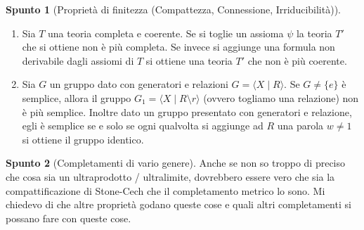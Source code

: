 \documentclass[a4paper,NoNotes,GeneralMath]{stdmdoc}
\theoremstyle{definition}
\newtheorem{spunto}{Spunto}
\begin{document}
\begin{spunto}[Proprietà di finitezza (Compattezza, Connessione, Irriducibilità)]
\begin{enumerate}
				\begin{enumerate}
					\item Se $\tau \subseteq \tau_{+}$ allora $(X, \tau_{+})$ non è più compatto.
					\item Se $\tau_{-} \subseteq \tau$ allora $(X, \tau_{-})$ non è più di Haussdorf.
				\end{enumerate}
			\item Sia $T$ una teoria completa e coerente. Se si toglie un assioma $\psi$ la teoria $T'$ che si ottiene non è più completa. Se invece si aggiunge una formula non derivabile dagli assiomi di $T$ si ottiene una teoria $T'$ che non è più coerente.
			\item Sia $G$ un gruppo dato con generatori e relazioni $G = \langle X \mid R \rangle$. Se $G \neq \{ e \}$ è semplice, allora il gruppo $G_1 = \langle X \mid R \setminus r \rangle$ (ovvero togliamo una relazione) non è più semplice.
				Inoltre dato un gruppo presentato con generatori e relazione, egli è semplice se e solo se ogni qualvolta si aggiunge ad $R$ una parola $w \neq 1$ si ottiene il gruppo identico.
		\end{enumerate} 
	\end{spunto}
	
	\begin{spunto}[Completamenti di vario genere]
		Anche se non so troppo di preciso che cosa sia un ultraprodotto / ultralimite, dovrebbero essere vero che sia la compattificazione di Stone-Cech che il completamento metrico lo sono. Mi chiedevo di che altre proprietà godano queste cose e quali altri completamenti si possano fare con queste cose.
	\end{spunto}
	
	
\end{document}
